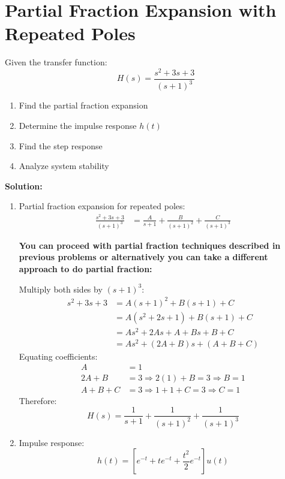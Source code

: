 \documentclass{article}
\begin{document}
\section{Partial Fraction Expansion with Repeated Poles}
Given the transfer function:
\[ H(s) = \frac{s^2 + 3s + 3}{(s + 1)^3} \]
\begin{enumerate}[label=(\alph*)]
    \item Find the partial fraction expansion
    \item Determine the impulse response $h(t)$
    \item Find the step response
    \item Analyze system stability
\end{enumerate}

\textbf{Solution:}
\begin{enumerate}[label=(\alph*)]
    \item Partial fraction expansion for repeated poles:
    \begin{align*}
        \frac{s^2 + 3s + 3}{(s + 1)^3} &= \frac{A}{s + 1} + \frac{B}{(s + 1)^2} + \frac{C}{(s + 1)^3}
    \end{align*}
    
    \textbf{You can proceed with partial fraction techniques described in previous problems or alternatively you can take a different approach to do partial fraction: }

    \vspace{10pt}
    
    Multiply both sides by $(s + 1)^3$:
    \begin{align*}
        s^2 + 3s + 3 &= A(s + 1)^2 + B(s + 1) + C \\
        &= A(s^2 + 2s + 1) + B(s + 1) + C \\
        &= As^2 + 2As + A + Bs + B + C \\
        &= As^2 + (2A + B)s + (A + B + C)
    \end{align*}
    Equating coefficients:
    \begin{align*}
        A &= 1 \\
        2A + B &= 3 \Rightarrow 2(1) + B = 3 \Rightarrow B = 1 \\
        A + B + C &= 3 \Rightarrow 1 + 1 + C = 3 \Rightarrow C = 1
    \end{align*}
    Therefore:
    \[ H(s) = \frac{1}{s + 1} + \frac{1}{(s + 1)^2} + \frac{1}{(s + 1)^3} \]
    
    \item Impulse response:
    \[ h(t) = \left[e^{-t} + te^{-t} + \frac{t^2}{2}e^{-t}\right]u(t) \]
    

\end{enumerate}
\end{document}

